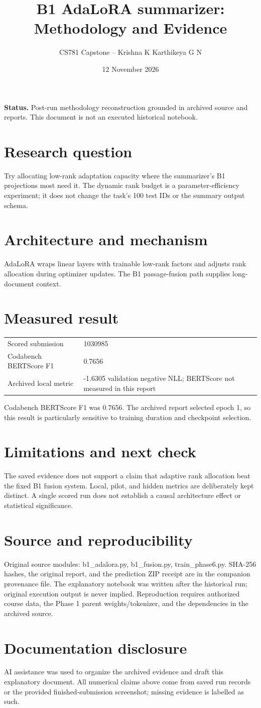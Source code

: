 \documentclass[11pt,a4paper]{article}
\title{B1 AdaLoRA summarizer: Methodology and Evidence}
\author{CS781 Capstone -- Krishna K Karthikeya G N}
\date{12 November 2026}
\begin{document}
\maketitle
\noindent\textbf{Status.} Post-run methodology reconstruction grounded in archived source and reports. This document is not an executed historical notebook.\par
\section*{Research question}
Try allocating low-rank adaptation capacity where the summarizer's B1 projections most need it. The dynamic rank budget is a parameter-efficiency experiment; it does not change the task's 100 test IDs or the summary output schema.
\section*{Architecture and mechanism}
AdaLoRA wraps linear layers with trainable low-rank factors and adjusts rank allocation during optimizer updates. The B1 passage-fusion path supplies long-document context.
\section*{Measured result}
\begin{center}\begin{tabular}{ll}Scored submission & 1030985\\
Codabench BERTScore F1 & 0.7656\\
Archived local metric & -1.6305 validation negative NLL; BERTScore not measured in this report\end{tabular}\end{center}
Codabench BERTScore F1 was 0.7656. The archived report selected epoch 1, so this result is particularly sensitive to training duration and checkpoint selection.
\section*{Limitations and next check}
The saved evidence does not support a claim that adaptive rank allocation beat the fixed B1 fusion system. Local, pilot, and hidden metrics are deliberately kept distinct. A single scored run does not establish a causal architecture effect or statistical significance.
\section*{Source and reproducibility}
Original source modules: b1\_adalora.py, b1\_fusion.py, train\_phase6.py. SHA-256 hashes, the original report, and the prediction ZIP receipt are in the companion provenance file. The explanatory notebook was written after the historical run; original execution output is never implied. Reproduction requires authorized course data, the Phase 1 parent weights/tokenizer, and the dependencies in the archived source.
\section*{Documentation disclosure}
AI assistance was used to organize the archived evidence and draft this explanatory document. All numerical claims above come from saved run records or the provided finished-submission screenshot; missing evidence is labelled as such.
\end{document}
